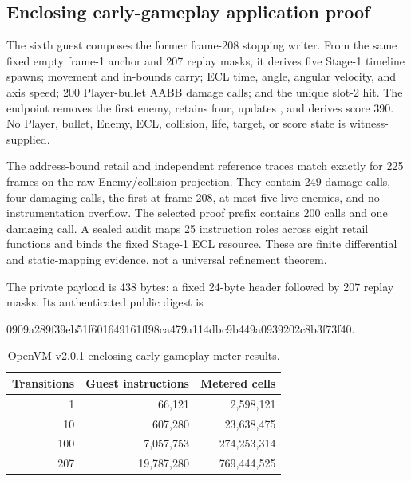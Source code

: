 \subsection{Enclosing early-gameplay application proof}

The sixth guest composes the former frame-208 stopping writer.  From the same
fixed empty frame-1 anchor and 207 replay masks, it derives five Stage-1
 timeline spawns; movement and in-bounds carry; ECL time, angle,
angular velocity, and axis speed; 200 Player-bullet AABB damage calls; and the
unique slot-2 hit.  The endpoint removes the first enemy, retains four, updates
, and derives score 390.  No Player, bullet,
Enemy, ECL, collision, life, target, or score state is witness-supplied.

The address-bound retail and independent reference traces match exactly for
225 frames on the raw Enemy/collision projection.  They contain 249 damage
calls, four damaging calls, the first at frame 208, at most five live enemies,
and no instrumentation overflow.  The selected proof prefix contains 200 calls
and one damaging call.  A sealed audit maps 25 instruction roles across eight
retail functions and binds the fixed Stage-1 ECL resource.  These are finite
differential and static-mapping evidence, not a universal refinement theorem.

The private  payload is 438 bytes: a fixed 24-byte header followed
by 207 replay masks.  Its authenticated public digest is
\begin{center}
\small\ttfamily
0909a289f39eb51f601649161ff98ca479a114dbc9b449a0939202c8b3f73f40.
\end{center}

\begin{table}[h]
  \centering
  \small
  \begin{tabular}{@{}rrr@{}}
    \toprule
    Transitions & Guest instructions & Metered cells \\
    \midrule
    1   & 66,121     & 2,598,121 \\
    10  & 607,280    & 23,638,475 \\
    100 & 7,057,753  & 274,253,314 \\
    207 & 19,787,280 & 769,444,525 \\
    \bottomrule
  \end{tabular}
  \caption{OpenVM v2.0.1 enclosing early-gameplay meter results.}
  \label{tab:openvm-early-gameplay-meter}
\end{table}

